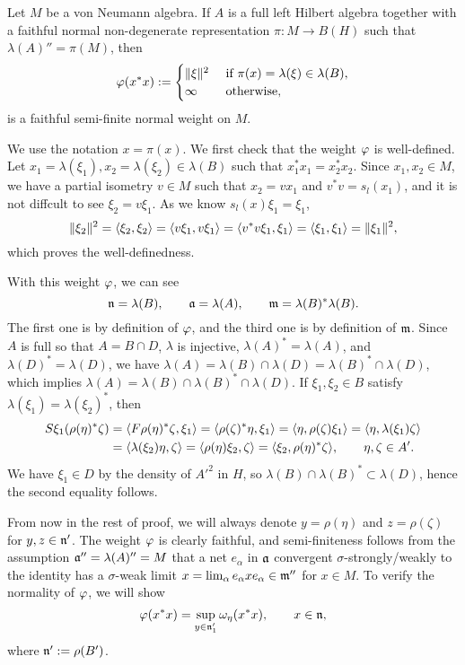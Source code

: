 \documentclass{../../small}
\begin{document}
\begin{thm}
Let $M$ be a von Neumann algebra.
If $A$ is a full left Hilbert algebra together with a faithful normal non-degenerate representation $\pi:M\to B(H)$ such that $\lambda(A)''=\pi(M)$, then
\[\varphi(x^*x):=\begin{cases}\|\xi\|^2&\text{ if }\pi(x)=\lambda(\xi)\in\lambda(B),\\\infty&\text{ otherwise},\end{cases}\]
is a faithful semi-finite normal weight on $M$.
\end{thm}
\begin{pf}
We use the notation $x=\pi(x)$.
We first check that the weight $\varphi$ is well-defined.
Let $x_1=\lambda(\xi_1),x_2=\lambda(\xi_2)\in\lambda(B)$ such that $x_1^*x_1=x_2^*x_2$.
Since $x_1,x_2\in M$, we have a partial isometry $v\in M$ such that $x_2=vx_1$ and $v^*v=s_l(x_1)$, and it is not diffcult to see $\xi_2=v\xi_1$.
As we know $s_l(x)\xi_1=\xi_1$,
\[\|\xi_2\|^2=\langle\xi_2,\xi_2\rangle=\langle v\xi_1,v\xi_1\rangle=\langle v^*v\xi_1,\xi_1\rangle=\langle\xi_1,\xi_1\rangle=\|\xi_1\|^2,\]
which proves the well-definedness.

With this weight $\varphi$, we can see
\[\mathfrak{n}=\lambda(B),\qquad\mathfrak{a}=\lambda(A),\qquad\mathfrak{m}=\lambda(B)^*\lambda(B).\]
The first one is by definition of $\varphi$, and the third one is by definition of $\mathfrak{m}$.
Since $A$ is full so that $A=B\cap D$, $\lambda$ is injective, $\lambda(A)^*=\lambda(A)$, and $\lambda(D)^*=\lambda(D)$, we have $\lambda(A)=\lambda(B)\cap\lambda(D)=\lambda(B)^*\cap\lambda(D)$, which implies $\lambda(A)=\lambda(B)\cap\lambda(B)^*\cap\lambda(D)$.
If $\xi_1,\xi_2\in B$ satisfy $\lambda(\xi_1)=\lambda(\xi_2)^*$, then
\begin{align*}
S\xi_1(\rho(\eta)^*\zeta)
&=\langle F\rho(\eta)^*\zeta,\xi_1\rangle
=\langle\rho(\zeta)^*\eta,\xi_1\rangle
=\langle\eta,\rho(\zeta)\xi_1\rangle
=\langle\eta,\lambda(\xi_1)\zeta\rangle\\
&=\langle\lambda(\xi_2)\eta,\zeta\rangle
=\langle\rho(\eta)\xi_2,\zeta\rangle
=\langle\xi_2,\rho(\eta)^*\zeta\rangle,
\qquad\eta,\zeta\in A'.
\end{align*}
We have $\xi_1\in D$ by the density of $A'^2$ in $H$, so $\lambda(B)\cap\lambda(B)^*\subset\lambda(D)$, hence the second equality follows.

From now in the rest of proof, we will always denote $y=\rho(\eta)$ and $z=\rho(\zeta)$ for $y,z\in\mathfrak{n}'$.
The weight $\varphi$ is clearly faithful, and semi-finiteness follows from the assumption $\mathfrak{a}''=\lambda(A)''=M$ that a net $e_\alpha$ in $\mathfrak{a}$ convergent $\sigma$-strongly/weakly to the identity has a $\sigma$-weak limit $x=\lim_\alpha e_\alpha xe_\alpha\in\mathfrak{m}''$ for $x\in M$.
To verify the normality of $\varphi$, we will show
\[\varphi(x^*x)=\sup_{y\in\mathfrak{n}'_1}\omega_{\eta}(x^*x),\qquad x\in\mathfrak{n},\]
where $\mathfrak{n}':=\rho(B')$.


\end{pf}
\end{document}

